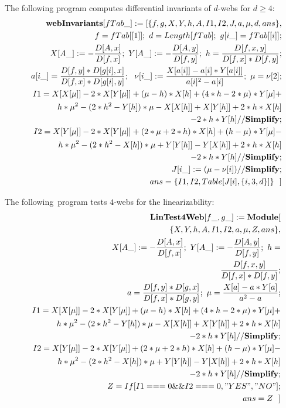 \documentclass{article}
\begin{document}
The following program computes differential invariants of $d$-webs for $%
d\geq 4$:
\begin{eqnarray*}
&&\mathbf{webInvariants}[fTab\_]:=[\{f,g,X,Y,h,A,I1,I2,J,a,\mu ,d,ans\}, \\
&&f=fTab[[1]];\ d=Length[fTab];\ g[i\_]=fTab[[i]]; \\
&&X[A\_]:=-\frac{D[A,x]}{D[f,x]};\ Y[A\_]:=-\frac{D[A,y]}{D[f,y]};\ h=\frac{%
D[f,x,y]}{D[f,x]\ast D[f,y]}; \\
&&a[i\_]=\frac{D[f,y]\ast D[g[i],x]}{D[f,x]\ast D[g[i],y]};\ \ \nu \lbrack
i\_]:=\frac{X[a[i]]-a[i]\ast Y[a[i]]}{a[i]^{2}-a[i]};\ \mu =\nu \lbrack 2];
\\
&&I1=X[X[\mu ]]-2\ast X[Y[\mu ]]+(\mu -h)\ast X[h]+(4\ast h-2\ast \mu )\ast
Y[\mu ]+ \\
&&h\ast \mu ^{2}-(2\ast h^{2}-Y[h])\ast \mu -X[X[h]]+X[Y[h]]+2\ast h\ast X[h]
\\
&&-2\ast h\ast Y[h]//\mathbf{Simplify;} \\
&&I2=X[Y[\mu ]]-2\ast X[Y[\mu ]]+(2\ast \mu +2\ast h)\ast X[h]+(h-\mu )\ast
Y[\mu ]- \\
&&h\ast \mu ^{2}-(2\ast h^{2}-X[h])\ast \mu +Y[Y[h]]-Y[X[h]]+2\ast h\ast X[h]
\\
&&-2\ast h\ast Y[h]//\mathbf{Simplify;} \\
&&J[i\_]:=(\mu -\nu \lbrack i])//\mathbf{Simplify;} \\
&&ans=\{I1,I2,Table[J[i],\{i,3,d\}]\}\ \ ]
\end{eqnarray*}

The following\ program tests $4$-webs for the linearizability:%
\begin{eqnarray*}
&&\mathbf{LinTest4Web}[f\_,g\_]:=\mathbf{Module}[ \\
&&\{X,Y,h,A,I1,I2,a,\mu ,Z,ans\}, \\
&&X[A\_]:=-\frac{D[A,x]}{D[f,x]};\ Y[A\_]:=-\frac{D[A,y]}{D[f,y]};\ h= \\
&&\frac{D[f,x,y]}{D[f,x]\ast D[f,y]}; \\
&&a=\frac{D[f,y]\ast D[g,x]}{D[f,x]\ast D[g,y]};\ \mu =\frac{X[a]-a\ast Y[a]%
}{a^{2}-a}; \\
&&I1=X[X[\mu ]]-2\ast X[Y[\mu ]]+(\mu -h)\ast X[h]+(4\ast h-2\ast \mu )\ast
Y[\mu ]+ \\
&&h\ast \mu ^{2}-(2\ast h^{2}-Y[h])\ast \mu -X[X[h]]+X[Y[h]]+2\ast h\ast X[h]
\\
&&-2\ast h\ast Y[h]//\mathbf{Simplify;} \\
&&I2=X[Y[\mu ]]-2\ast X[Y[\mu ]]+(2\ast \mu +2\ast h)\ast X[h]+(h-\mu )\ast
Y[\mu ]- \\
&&h\ast \mu ^{2}-(2\ast h^{2}-X[h])\ast \mu +Y[Y[h]]-Y[X[h]]+2\ast h\ast X[h]
\\
&&-2\ast h\ast Y[h]//\mathbf{Simplify;} \\
&&Z=If[I1===0\&\&I2===0,"YES","NO"]; \\
&&ans=Z\ \ ]
\end{eqnarray*}
\end{document}

